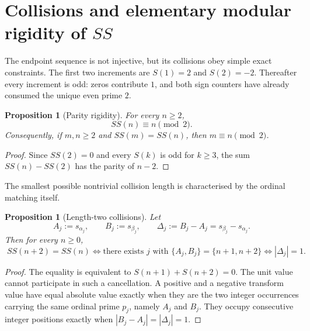 \documentclass[11pt]{amsart}
\numberwithin{equation}{section}
\theoremstyle{plain}
\newtheorem{proposition}[theorem]{Proposition}
\theoremstyle{definition}
\theoremstyle{remark}
\begin{document}
\section{Collisions and elementary modular rigidity of \texorpdfstring{$SS$}{SS}}
\label{sec:ss-collisions}

The endpoint sequence is not injective, but its collisions obey simple exact
constraints.  The first two increments are $S(1)=2$ and $S(2)=-2$.  Thereafter
every increment is odd: zeros contribute $1$, and both sign counters have
already consumed the unique even prime $2$.

\begin{proposition}[Parity rigidity]
\label{prop:ss-parity}
For every $n\ge2$,
\begin{equation}
\label{eq:ss-parity}
\boxed{\;SS(n)\equiv n\pmod2.\;}
\end{equation}
Consequently, if $m,n\ge2$ and $SS(m)=SS(n)$, then $m\equiv n\pmod2$.
\end{proposition}

\begin{proof}
Since $SS(2)=0$ and every $S(k)$ is odd for $k\ge3$, the sum
$SS(n)-SS(2)$ has the parity of $n-2$.
\end{proof}

The smallest possible nontrivial collision length is characterised by the
ordinal matching itself.

\begin{proposition}[Length-two collisions]
\label{prop:length-two-collision}
Let
\begin{equation}
\label{eq:AB-integer-pairing}
A_j:=s_{\alpha_j},
\qquad
B_j:=s_{\beta_j},
\qquad
\Delta_j:=B_j-A_j=s_{\beta_j}-s_{\alpha_j}.
\end{equation}
Then for every $n\ge0$,
\begin{equation}
\label{eq:length-two-collision}
\boxed{\;SS(n+2)=SS(n)\iff
\text{there exists }j\text{ with }\{A_j,B_j\}=\{n+1,n+2\}
\iff |\Delta_j|=1.\;}
\end{equation}
\end{proposition}

\begin{proof}
The equality is equivalent to $S(n+1)+S(n+2)=0$.  The unit value cannot
participate in such a cancellation.  A positive and a negative transform value
have equal absolute value exactly when they are the two integer occurrences
carrying the same ordinal prime $p_j$, namely $A_j$ and $B_j$.  They occupy
consecutive integer positions exactly when $|B_j-A_j|=|\Delta_j|=1$.
\end{proof}
\end{document}
